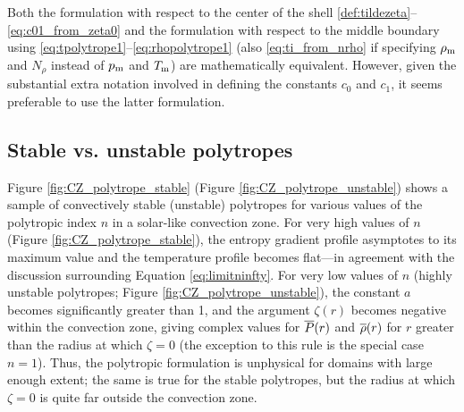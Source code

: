 \documentclass[12pt]{article} %
\begin{document}
Both the formulation with respect to the center of the shell \eqref{def:tildezeta}--\eqref{eq:c01_from_zeta0} and the formulation with respect to the middle boundary using \eqref{eq:tpolytrope1}--\eqref{eq:rhopolytrope1} (also \eqref{eq:ti_from_nrho} if specifying $\rho_{\rm{m}}$ and $N_\rho$ instead of $p_{\rm{m}}$ and $T_{\rm{m}}$) are mathematically equivalent. However, given the substantial extra notation involved in defining the constants $c_0$ and $c_1$, it seems preferable to use the latter formulation. 

\subsection{Stable vs. unstable polytropes}
Figure \ref{fig:CZ_polytrope_stable} (Figure \ref{fig:CZ_polytrope_unstable}) shows a sample of convectively stable (unstable) polytropes for various values of the polytropic index $n$ in a solar-like convection zone. For very high values of $n$ (Figure \ref{fig:CZ_polytrope_stable}), the entropy gradient profile asymptotes to its maximum value and the temperature profile becomes flat---in agreement with the discussion surrounding Equation \eqref{eq:limitninfty}. For very low values of $n$ (highly unstable polytropes; Figure \ref{fig:CZ_polytrope_unstable}), the constant $a$ becomes significantly greater than 1, and the argument $\zeta(r)$ becomes negative within the convection zone, giving complex values for $\overline{P}(r)$ and $\overline{\rho}(r)$ for $r$ greater than the radius at which $\zeta=0$ (the exception to this rule is the special case $n=1$). Thus, the polytropic formulation is unphysical for domains with large enough extent; the same is true for the stable polytropes, but the radius at which $\zeta=0$ is quite far outside the convection zone.
\end{document}
